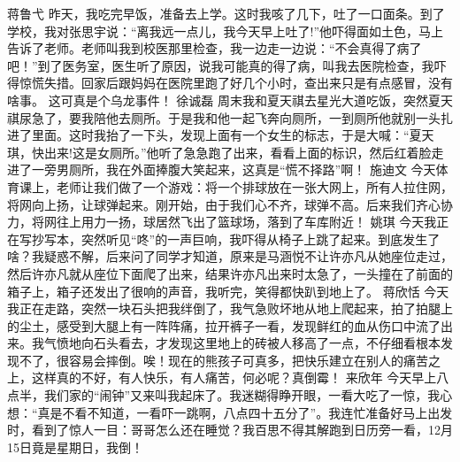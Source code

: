 {}\markdownRendererInterblockSeparator
{}蒋鲁弋\markdownRendererInterblockSeparator
{}昨天，我吃完早饭，准备去上学。这时我咳了几下，吐了一口面条。到了学校，我对张思宇说：“离我远一点儿，我今天早上吐了!”他吓得面如土色，马上告诉了老师。老师叫我到校医那里检查，我一边走一边说：“不会真得了病了吧！”到了医务室，医生听了原因，说我可能真的得了病，叫我去医院检查，我吓得惊慌失措。回家后跟妈妈在医院里跑了好几个小时，查出来只是有点感冒，没有啥事。 这可真是个乌龙事件！\markdownRendererInterblockSeparator
{}\markdownRendererInterblockSeparator
{}徐诚磊\markdownRendererInterblockSeparator
{}周末我和夏天祺去星光大道吃饭，突然夏天祺尿急了，要我陪他去厕所。于是我和他一起飞奔向厕所，一到厕所他就别一头扎进了里面。这时我抬了一下头，发现上面有一个女生的标志，于是大喊：“夏天琪，快出来!这是女厕所。”他听了急急跑了出来，看看上面的标识，然后红着脸走进了一旁男厕所，我在外面捧腹大笑起来，这真是“慌不择路”啊！\markdownRendererInterblockSeparator
{}\markdownRendererInterblockSeparator
{}施迪文\markdownRendererInterblockSeparator
{}今天体育课上，老师让我们做了一个游戏：将一个排球放在一张大网上，所有人拉住网，将网向上扬，让球弹起来。刚开始，由于我们心不齐，球弹不高。后来我们齐心协力，将网往上用力一扬，球居然飞出了篮球场，落到了车库附近！\markdownRendererInterblockSeparator
{}\markdownRendererInterblockSeparator
{}姚琪\markdownRendererInterblockSeparator
{}今天我正在写抄写本，突然听见“咚”的一声巨响，我吓得从椅子上跳了起来。到底发生了啥？我疑惑不解，后来问了同学才知道，原来是马涵悦不让许亦凡从她座位走过，然后许亦凡就从座位下面爬了出来，结果许亦凡出来时太急了，一头撞在了前面的箱子上，箱子还发出了很响的声音，我听完，笑得都快趴到地上了。\markdownRendererInterblockSeparator
{}\markdownRendererInterblockSeparator
{}蒋欣恬\markdownRendererInterblockSeparator
{}今天我正在走路，突然一块石头把我绊倒了，我气急败坏地从地上爬起来，拍了拍腿上的尘土，感受到大腿上有一阵阵痛，拉开裤子一看，发现鲜红的血从伤口中流了出来。我气愤地向石头看去，才发现这里地上的砖被人移高了一点，不仔细看根本发现不了，很容易会摔倒。唉！现在的熊孩子可真多，把快乐建立在别人的痛苦之上，这样真的不好，有人快乐，有人痛苦，何必呢？真倒霉！\markdownRendererInterblockSeparator
{}\markdownRendererInterblockSeparator
{}来欣年\markdownRendererInterblockSeparator
{}今天早上八点半，我们家的“闹钟”又来叫我起床了。我迷糊得睁开眼，一看大吃了一惊，我心想：“真是不看不知道，一看吓一跳啊，八点四十五分了”。我连忙准备好马上出发时，看到了惊人一目：哥哥怎么还在睡觉？我百思不得其解跑到日历旁一看，12月15日竟是星期日，我倒！\markdownRendererInterblockSeparator
